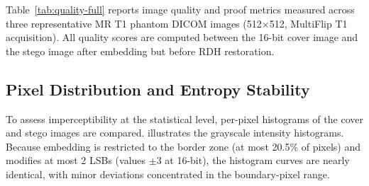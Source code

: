 \documentclass{jstarticle}
\begin{document}
Table~\ref{tab:quality-full} reports image quality and proof metrics measured across three representative MR T1 phantom DICOM images (512$\times$512, MultiFlip T1 acquisition).
All quality scores are computed between the 16-bit cover image and the stego image after embedding but before RDH restoration.

\begin{table}[t]
    \centering
    \caption{Image Quality and Proof Metrics}
    \label{tab:quality-full}
\end{table}

\subsection{Pixel Distribution and Entropy Stability}

To assess imperceptibility at the statistical level, per-pixel histograms of the cover and stego images are compared.
 illustrates the grayscale intensity histograms.
Because embedding is restricted to the border zone (at most 20.5\% of pixels) and modifies at most 2 LSBs (values $\pm 3$ at 16-bit), the histogram curves are nearly identical, with minor deviations concentrated in the boundary-pixel range.
\end{document}
